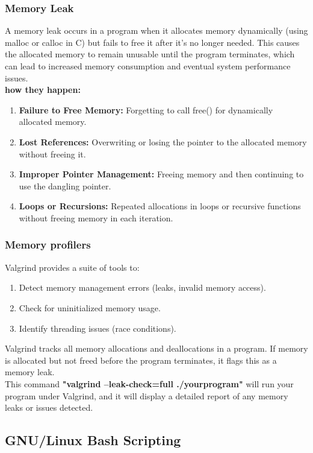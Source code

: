 \documentclass{article}
\begin{document}
        \subsubsection{Memory Leak}
        A memory leak occurs in a program when it allocates memory dynamically (using malloc or calloc in C) but fails to free it after it's no longer needed. This causes the allocated memory to remain unusable until the program terminates, which can lead to increased memory consumption and eventual system performance issues.
        \\\textbf{how they happen:}
        \begin{enumerate}
            \item \textbf{Failure to Free Memory:} Forgetting to call free() for dynamically allocated memory.
            \item \textbf{Lost References:} Overwriting or losing the pointer to the allocated memory without freeing it.
            \item \textbf{Improper Pointer Management:} Freeing memory and then continuing to use the dangling pointer.
            \item \textbf{Loops or Recursions:} Repeated allocations in loops or recursive functions without freeing memory in each iteration.
        \end{enumerate}
        \subsubsection{Memory profilers}
        Valgrind provides a suite of tools to:
        \begin{enumerate}
            \item Detect memory management errors (leaks, invalid memory access).
            \item Check for uninitialized memory usage.
            \item Identify threading issues (race conditions).
        \end{enumerate}
        Valgrind tracks all memory allocations and deallocations in a program. If memory is allocated but not freed before the program terminates, it flags this as a memory leak.
        \\This command \textbf{"valgrind --leak-check=full ./yourprogram"} will run your program under Valgrind, and it will display a detailed report of any memory leaks or issues detected.
    \subsection{GNU/Linux Bash Scripting}
\end{document}
